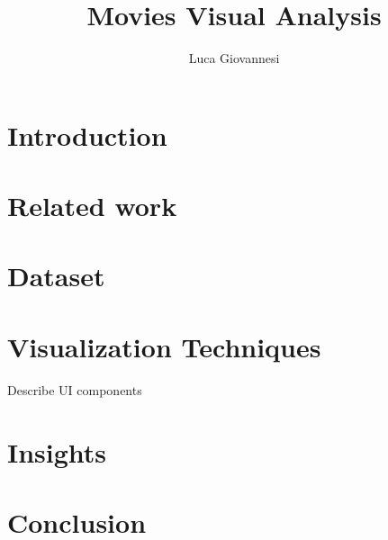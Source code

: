 \documentclass[]{article}
\title{Movies Visual Analysis}
\author{Luca Giovannesi}
\begin{document}
\maketitle

\section{Introduction}
\section{Related work}
\section{Dataset}
\section{Visualization Techniques}
Describe UI components
\section{Insights}
\section{Conclusion}
\end{document}
